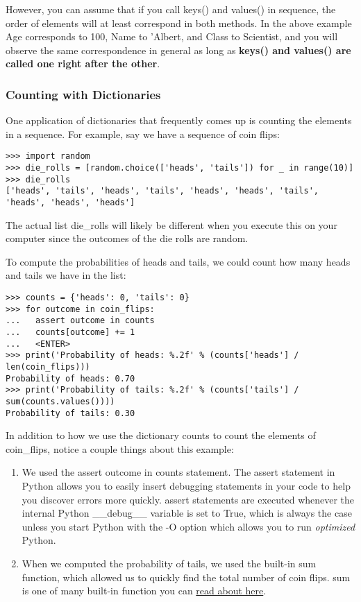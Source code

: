 However, you can assume that if you call keys() and values() in
sequence, the order of elements will at least correspond in both
methods. In the above example Age corresponds to 100, Name to 'Albert,
and Class to Scientist, and you will observe the same correspondence in
general as long as \textbf{keys() and values() are called one right
after the other}.

\subsubsection{Counting with
Dictionaries}\label{counting-with-dictionaries}

One application of dictionaries that frequently comes up is counting the
elements in a sequence. For example, say we have a sequence of coin
flips:

\begin{verbatim}
>>> import random
>>> die_rolls = [random.choice(['heads', 'tails']) for _ in range(10)]
>>> die_rolls
['heads', 'tails', 'heads', 'tails', 'heads', 'heads', 'tails', 'heads', 'heads', 'heads']
\end{verbatim}

The actual list die\_rolls will likely be different when you execute
this on your computer since the outcomes of the die rolls are random.

To compute the probabilities of heads and tails, we could count how many
heads and tails we have in the list:

\begin{verbatim}
>>> counts = {'heads': 0, 'tails': 0}
>>> for outcome in coin_flips:
...   assert outcome in counts
...   counts[outcome] += 1
...   <ENTER>
>>> print('Probability of heads: %.2f' % (counts['heads'] / len(coin_flips)))
Probability of heads: 0.70
>>> print('Probability of tails: %.2f' % (counts['tails'] / sum(counts.values())))
Probability of tails: 0.30
\end{verbatim}

In addition to how we use the dictionary counts to count the elements of
coin\_flips, notice a couple things about this example:

\begin{enumerate}

\item
  We used the assert outcome in counts statement. The assert statement
  in Python allows you to easily insert debugging statements in your
  code to help you discover errors more quickly. assert statements are
  executed whenever the internal Python \_\_debug\_\_ variable is set to
  True, which is always the case unless you start Python with the -O
  option which allows you to run \emph{optimized} Python.
\item
  When we computed the probability of tails, we used the built-in sum
  function, which allowed us to quickly find the total number of coin
  flips. sum is one of many built-in function you can
  \href{https://docs.python.org/2/library/functions.html}{read about
  here}.
\end{enumerate}

